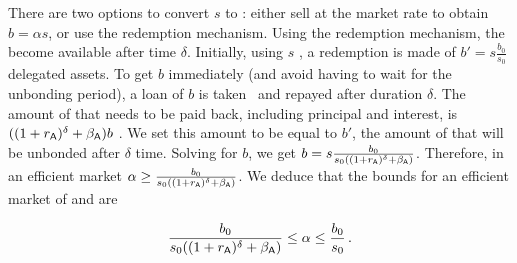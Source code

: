 There are two options to convert $s$ \stasset to \asset: either sell
at the market rate to obtain $b = \alpha s$, or use the redemption mechanism.
Using the redemption mechanism, the \assets become available after time $\delta$.
Initially, using $s$ \stasset, a redemption is made of $b' = s \frac{b_0}{s_0}$
delegated assets. To get $b$ \asset immediately (and avoid having to wait
for the unbonding period), a loan of $b$ \asset is taken~\cite{liquid-staking-report} and
repayed after duration $\delta$. The amount of \asset that needs to be paid back,
including principal and interest, is $((1 + r_{\textsf{A}})^\delta + \beta_{\textsf{A}})b$ \asset.
We set this amount to be equal to $b'$, the amount of \assets that will be
unbonded after $\delta$ time. Solving for $b$, we get
$b = s \frac{b_0}{s_0 ((1 + r_{\textsf{A}})^\delta + \beta_{\textsf{A}})}$.
Therefore, in an efficient market $\alpha \geq \frac{b_0}{s_0 ((1 + r_{\textsf{A}})^\delta + \beta_{\textsf{A}})}$.
We deduce that the bounds for an efficient market of \asset and \stasset are

\[
  \frac{b_0}{s_0 ((1 + r_{\textsf{A}})^\delta + \beta_{\textsf{A}})} \leq \alpha \leq \frac{b_0}{s_0}\,.
\]


%
%
%
%





